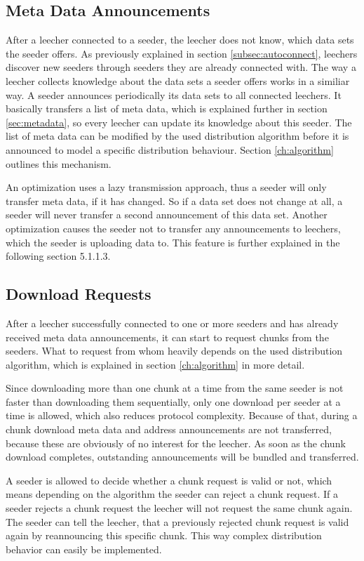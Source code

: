 \subsection{Meta Data Announcements}
After a leecher connected to a seeder, the leecher does not know, which data sets the seeder offers. As previously explained in section \ref{subsec:autoconnect}, leechers discover new seeders through seeders they are already connected with. The way a leecher collects knowledge about the data sets a seeder offers works in a similiar way. A seeder announces periodically its data sets to all connected leechers. It basically transfers a list of meta data, which is explained further in section \ref{sec:metadata}, so every leecher can update its knowledge about this seeder. The list of meta data can be modified by the used distribution algorithm before it is announced to model a specific distribution behaviour. Section \ref{ch:algorithm} outlines this mechanism.

An optimization uses a lazy transmission approach, thus a seeder will only transfer meta data, if it has changed. So if a data set does not change at all, a seeder will never transfer a second announcement of this data set. Another optimization causes the seeder not to transfer any announcements to leechers, which the seeder is uploading data to. This feature is further explained in the following section 5.1.1.3.


\subsection{Download Requests}
\label{subsec:downloadreq}
After a leecher successfully connected to one or more seeders and has already received meta data announcements, it can start to request chunks from the seeders. What to request from whom heavily depends on the used distribution algorithm, which is explained in section \ref{ch:algorithm} in more detail. 

Since downloading more than one chunk at a time from the same seeder is not faster than downloading them sequentially, only one download per seeder at a time is allowed, which also reduces protocol complexity. Because of that, during a chunk download meta data and address announcements are not transferred, because these are obviously of no interest for the leecher. As soon as the chunk download completes, outstanding announcements will be bundled and transferred.

A seeder is allowed to decide whether a chunk request is valid or not, which means depending on the algorithm the seeder can reject a chunk request. If a seeder rejects a chunk request the leecher will not request the same chunk again. The seeder can tell the leecher, that a previously rejected chunk request is valid again by reannouncing this specific chunk. This way complex distribution behavior
can easily be implemented.


